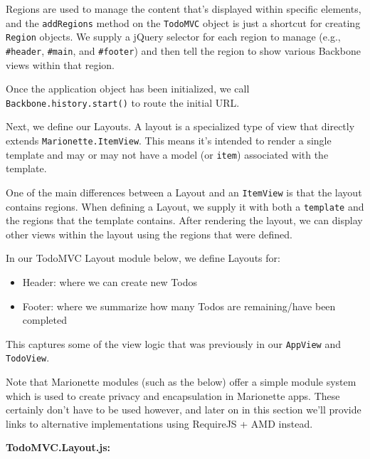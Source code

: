 \documentclass[9pt]{book}
\begin{document}
Regions are used to manage the content that's displayed within specific
elements, and the \texttt{addRegions} method on the \texttt{TodoMVC}
object is just a shortcut for creating \texttt{Region} objects. We
supply a jQuery selector for each region to manage (e.g.,
\texttt{\#header}, \texttt{\#main}, and \texttt{\#footer}) and then tell
the region to show various Backbone views within that region.

Once the application object has been initialized, we call
\texttt{Backbone.history.start()} to route the initial URL.

Next, we define our Layouts. A layout is a specialized type of view that
directly extends \texttt{Marionette.ItemView}. This means it's intended
to render a single template and may or may not have a model (or
\texttt{item}) associated with the template.

One of the main differences between a Layout and an \texttt{ItemView} is
that the layout contains regions. When defining a Layout, we supply it
with both a \texttt{template} and the regions that the template
contains. After rendering the layout, we can display other views within
the layout using the regions that were defined.

In our TodoMVC Layout module below, we define Layouts for:

\begin{itemize}
\itemsep1pt\parskip0pt
\item
  Header: where we can create new Todos
\item
  Footer: where we summarize how many Todos are remaining/have been
  completed
\end{itemize}

This captures some of the view logic that was previously in our
\texttt{AppView} and \texttt{TodoView}.

Note that Marionette modules (such as the below) offer a simple module
system which is used to create privacy and encapsulation in Marionette
apps. These certainly don't have to be used however, and later on in
this section we'll provide links to alternative implementations using
RequireJS + AMD instead.

\textbf{TodoMVC.Layout.js:}
\end{document}
